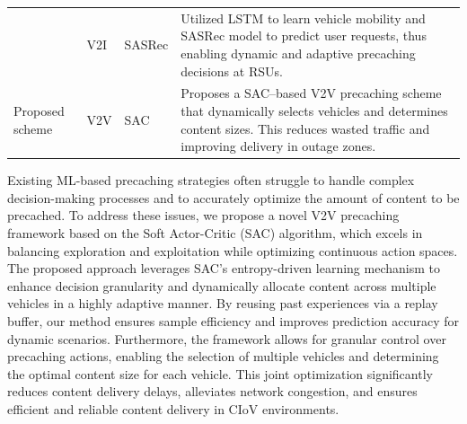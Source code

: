 \documentclass{aims}
\numberwithin{equation}{section}
\begin{document}
\begin{table}[H]
\begin{tabular}{C{0.11\textwidth}C{0.08\textwidth}C{0.11\textwidth}L{0.58\textwidth}}
        \cite{Feng2023} & V2I & SASRec &
                Utilized LSTM to learn vehicle mobility and SASRec model to predict user requests, thus enabling dynamic and adaptive precaching decisions at RSUs.\\
       
        Proposed scheme & V2V & SAC &
                Proposes a SAC–based V2V precaching scheme that dynamically selects vehicles and determines content sizes.
                This reduces wasted traffic and improving delivery in outage zones.\\
        \hline
         
    \end{tabular}
    \label{tab:mob}
\end{table}

Existing ML-based precaching strategies often struggle to handle complex decision-making processes and to accurately optimize the amount of content to be precached. To address these issues, we propose a novel V2V precaching framework based on the Soft Actor-Critic (SAC) algorithm, which excels in balancing exploration and exploitation while optimizing continuous action spaces. The proposed approach leverages SAC's entropy-driven learning mechanism to enhance decision granularity and dynamically allocate content across multiple vehicles in a highly adaptive manner. By reusing past experiences via a replay buffer, our method ensures sample efficiency and improves prediction accuracy for dynamic scenarios. Furthermore, the framework allows for granular control over precaching actions, enabling the selection of multiple vehicles and determining the optimal content size for each vehicle. This joint optimization significantly reduces content delivery delays, alleviates network congestion, and ensures efficient and reliable content delivery in CIoV environments.
\newpage
\end{document}
